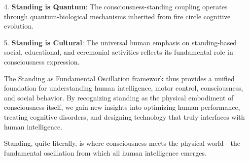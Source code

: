 \documentclass[12pt]{article}
\begin{document}
4. \textbf{Standing is Quantum}: The consciousness-standing coupling operates through quantum-biological mechanisms inherited from fire circle cognitive evolution.

5. \textbf{Standing is Cultural}: The universal human emphasis on standing-based social, educational, and ceremonial activities reflects its fundamental role in consciousness expression.

The Standing as Fundamental Oscillation framework thus provides a unified foundation for understanding human intelligence, motor control, consciousness, and social behavior. By recognizing standing as the physical embodiment of consciousness itself, we gain new insights into optimizing human performance, treating cognitive disorders, and designing technology that truly interfaces with human intelligence.

Standing, quite literally, is where consciousness meets the physical world - the fundamental oscillation from which all human intelligence emerges.



\end{document}
